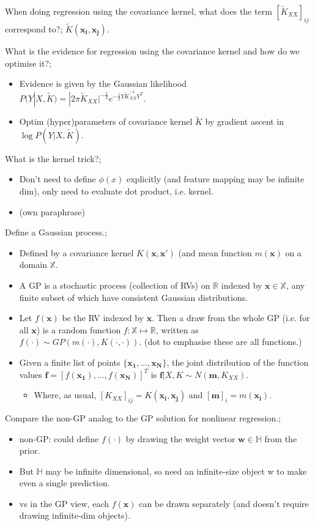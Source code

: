 \documentclass{article}
\begin{document}
When doing regression using the covariance kernel, what does the term $[\tilde{K}_{XX}]_{ij}$ correspond to?; $\tilde{K}(\mathbf{x_i, x_j})$.

What is the evidence for regression using the covariance kernel and how do we optimise it?; \begin{itemize} \item Evidence is given by the Gaussian likelihood $P(Y|X, \tilde{K})=|2\pi\tilde{K}_{XX}|^{-\frac{1}{2}}e^{-\frac{1}{2}Y\tilde{K}_{XX}^{-1}Y^T}$.  \item Optim (hyper)parameters of covariance kernel $\tilde{K}$ by gradient ascent in $\log P(Y|X, \tilde{K})$.  \end{itemize} 

What is the kernel trick?; \begin{itemize} \item Don't need to define $\phi(x)$ explicitly (and feature mapping may be infinite dim), only need to evaluate dot product, i.e. kernel.  \item (own paraphrase) \end{itemize}

Define a Gaussian process.; \begin{itemize} \item Defined by a covariance kernel $K(\mathbf{x, x'})$ (and mean function $m(\mathbf{x})$ on a domain $\mathbb{X}$.  \item A GP is a stochastic process (collection of RVs) on $\mathbb{R}$ indexed by $\mathbf{x}\in \mathbb{X}$, any finite subset of which have consistent Gaussian distributions.  \item Let $f(\mathbf{x})$ be the RV indexed by $\mathbf{x}$. Then a draw from the whole GP (i.e. for all $\mathbf{x}$) is a random function $f:\mathbb{X}\mapsto\mathbb{R}$, written as $f(\cdot)\sim GP(m(\cdot), K(\cdot, \cdot))$. (dot to emphasise these are all functions.) \item Given a finite list of points $\{\mathbf{x_1,...,x_N}\}$, the joint distribution of the function values $\mathbf{f}=[f(\mathbf{x_1}),...,f(\mathbf{x_N})]^T$ is $\mathbf{f}|X, K\sim N(\mathbf{m}, K_{XX})$.  \begin{itemize} \item Where, as usual, $[K_{XX}]_{ij}=K(\mathbf{x_i, x_j})$ and $[\mathbf{m}]_i=m(\mathbf{x_i})$.  \end{itemize} \end{itemize}

Compare the non-GP analog to the GP solution for nonlinear regression.; \begin{itemize} \item non-GP: could define $f(\cdot)$ by drawing the weight vector $\mathbf{w}\in \mathbb{H}$ from the prior.  \item But $\mathbb{H}$ may be infinite dimensional, so need an infinite-size object w to make even a single prediction.  \item vs in the GP view, each $f(\mathbf{x})$ can be drawn separately (and doesn't require drawing infinite-dim objects).  \end{itemize}
\end{document}

